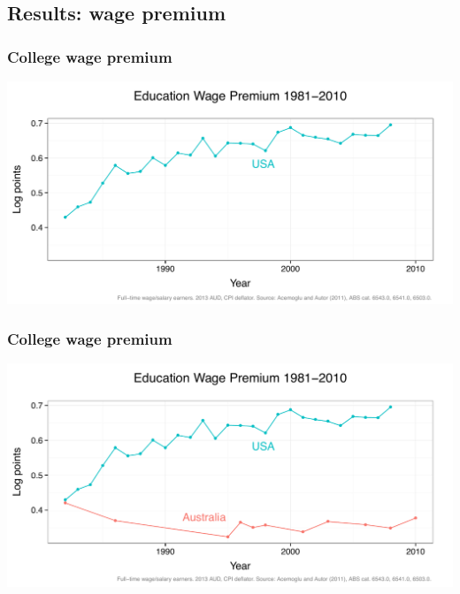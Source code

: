 \documentclass[red]{beamer}
\begin{document}
\subsection{Results: wage premium}
\begin{frame}
  \frametitle{College wage premium}
  \begin{center}
    \includegraphics[width=\textwidth]{slides_fig/ed_premium_us.pdf}
  \end{center}
\end{frame}

\begin{frame}
  \frametitle{College wage premium}
  \begin{center}
    \includegraphics[width=\textwidth]{slides_fig/ed_premium.pdf}
  \end{center}
\end{frame}
\end{document}
